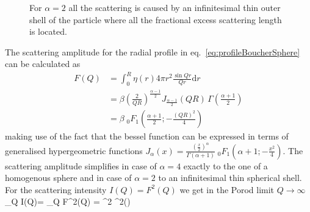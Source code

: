 \begin{figure}[htb]
\captionsetup[subfigure]{position=b}
\centering
{}
\hfill
{}
\caption{For $\alpha=2$ all the scattering is caused by an infinitesimal thin outer shell of the particle where all the fractional excess scattering length is located.}
\label{fig:BoucherZr}
\end{figure}

The scattering amplitude for the radial profile in eq.\ \ref{eq:profileBoucherSphere} can be calculated as
\begin{align}
 F(Q) &= \int_0^R \eta(r) 4\pi r^2 \frac{\sin Qr}{Qr}\mathrm{d}r \nonumber \\
      &= \beta \left(\frac{2}{QR}\right)^{\frac{\alpha-1}{2}} J_{\frac{\alpha-1}{2}}(QR) \, \Gamma\left(\frac{\alpha+1}{2}\right) \nonumber \\
      &= \beta \;_0F_1\left(\frac{\alpha+1}{2};-\tfrac{(QR)^2}{4}\right)
\end{align}
making use of the fact that the bessel function can be expressed in terms of generalised hypergeometric functions $J_\alpha(x)=\frac{(\frac{x}{2})^\alpha}{\Gamma(\alpha+1)}  \;_0F_1 (\alpha+1; -\tfrac{x^2}{4})$. The scattering amplitude simplifies in case of $\alpha=4$ exactly to the one of a homogenous sphere and in case of $\alpha=2$ to an infinitesimal thin spherical shell. For the scattering intensity $I(Q) = F^2(Q)$ we get in the Porod limit $Q\rightarrow\infty$
\BE
 \lim_{Q\rightarrow\infty} I(Q)= \lim_{Q\rightarrow\infty}  F^2(Q) =
 \beta^2  \Gamma^2\left(\right) 
\EE

